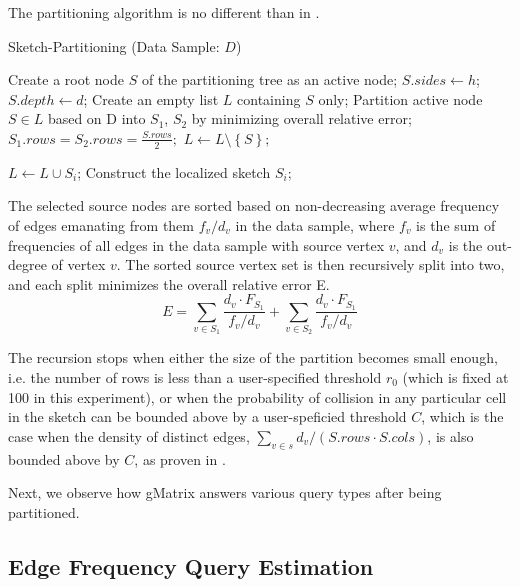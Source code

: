 The partitioning algorithm is no different than in \cite{DBLP}. 

\begin{algorithm}
\caption{Sketch-Partitioning (Data Sample: $D$)}\label{euclid}
\begin{algorithmic}[1]

\State Create a root node $S$ of the partitioning tree as an
active node;
\State $S.sides \gets h$;
\State $S.depth \gets d$;
\State Create an empty list $L$ containing $S$ only;
\State Partition active node $S \in L$ based on D into $S_1$, $S_2$ by minimizing overall relative error;
\State $S_1.rows = S_2.rows = \frac{S.rows}{2};$
\State $L \gets L \setminus \left \{ S \right \};$
    
    \State $L \gets L \cup S_i$;
    \Else
    \State Construct the localized sketch $S_i$;
    
    \EndIf
\EndFor
\EndWhile

\end{algorithmic}
\end{algorithm}

The selected source nodes are sorted based on non-decreasing average frequency of edges emanating from them $f_v/d_v$ in the data sample, where $f_v$ is the sum of frequencies of all edges in the data sample with source vertex $v$, and $d_v$ is the out-degree of vertex $v$. The sorted source vertex set is then recursively split into two, and each split minimizes the overall relative error E. \[E = \sum_{v \in S_1} \frac{d_v \cdot F_{S_1}}{f_v / d_v} + \sum_{v \in S_2} \frac{d_v \cdot F_{S_1}}{f_v / d_v}\]

The recursion stops when either the size of the partition becomes small enough, i.e. the number of rows is less than a user-specified threshold $r_0$ (which is fixed at 100 in this experiment), or when the probability of collision in any particular cell in the sketch can be bounded above by a user-speficied threshold $C$, which is the case when the density of distinct edges, $\sum_{v \in s} d_v/(S.rows \cdot S.cols)$, is also bounded above by $C$, as proven in \cite{DBLP}.

Next, we observe how gMatrix answers various query types after being partitioned.

\subsection{Edge Frequency Query Estimation}

